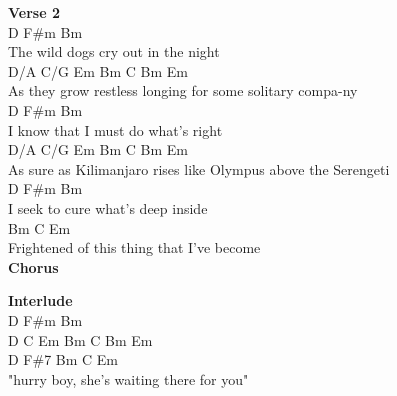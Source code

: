 \documentclass[a4paper]{article}
\begin{document}
{{        }
        \textbf{Verse 2}
        ~\\
        {
            \cutive
            \obeyspaces
D             F\#m            Bm
\\
The wild dogs cry out in the night
\\
D/A                  C/G              Em      Bm   C Bm Em
\\
As they grow restless longing for some solitary compa-ny
\\
D           F\#m              Bm
\\
I know that I must do what's right
\\
D/A                   C/G        Em               Bm    C Bm Em
\\
As sure as Kilimanjaro rises like Olympus above the Serengeti
\\
D         F\#m                Bm
\\
I seek to cure what's deep inside
\\
Bm                C                   Em
\\
Frightened of this thing that I've become
\\

        }
        \textbf{Chorus}
        ~\\
        {
            \cutive
            \obeyspaces

        }
        \textbf{Interlude}
        ~\\
        {
            \cutive
            \obeyspaces
D   F\#m  Bm
\\
D   C    Em  Bm   C Bm Em
\\
D   F\#7  Bm                 C                  Em
\\
            "hurry boy, she's waiting there for you"
\\

}}
\end{document}
